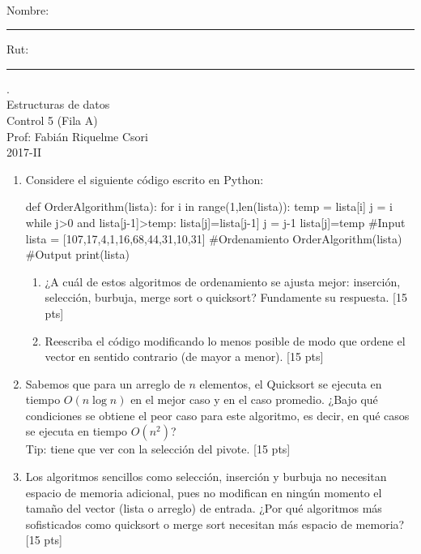 \documentclass[letter,12pt,oneside]{book}
\theoremstyle{definition}
\begin{document}

\begin{center}
$~$
\end{center}

\noindent
Nombre: \rule{.6\textwidth}{.5pt} Rut: \rule{.24\textwidth}{.5pt}

\begin{center}
 {\Large
  {\color{white}.}\\
  Estructuras de datos\\[1ex]
  Control 5 (Fila A)}\\[1.2ex]
  Prof: Fabián Riquelme Csori\\
  2017-II
\end{center}

\begin{enumerate}
    \item Considere el siguiente código escrito en Python:
    
    \begin{python}
def OrderAlgorithm(lista):
    for i in range(1,len(lista)):
        temp = lista[i]
        j = i
        while j>0 and lista[j-1]>temp:
            lista[j]=lista[j-1]
            j = j-1
        lista[j]=temp
#Input
lista = [107,17,4,1,16,68,44,31,10,31]
#Ordenamiento
OrderAlgorithm(lista)
#Output
print(lista)
    \end{python}
    
    \begin{enumerate}
        \item ¿A cuál de estos algoritmos de ordenamiento se ajusta mejor: inserción, selección, burbuja, merge sort o quicksort? Fundamente su respuesta. \tabto{76ex} [15 pts]
        \item Reescriba el código modificando lo menos posible de modo que ordene el vector en sentido contrario (de mayor a menor). \tabto{76ex} [15 pts]
    \end{enumerate}
    \item Sabemos que para un arreglo de $n$ elementos, el Quicksort se ejecuta en tiempo $O(n\log n)$ en el mejor caso y en el caso promedio. ¿Bajo qué condiciones se obtiene el peor caso para este algoritmo, es decir, en qué casos se ejecuta en tiempo $O(n^2)$?\\Tip: tiene que ver con la selección del pivote. \tabto{81ex} [15 pts]
    \item Los algoritmos sencillos como selección, inserción y burbuja no necesitan espacio de memoria adicional, pues no modifican en ningún momento el tamaño del vector (lista o arreglo) de entrada. ¿Por qué algoritmos más sofisticados como quicksort o merge sort necesitan más espacio de memoria? \tabto{81ex} [15 pts]
\end{enumerate}
\end{document}
